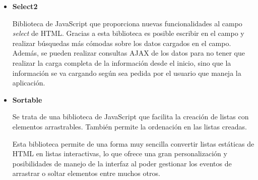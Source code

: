 \begin{itemize}
\item\textbf{Select2}

Biblioteca de JavaScript que proporciona nuevas funcionalidades al campo \textit{select} de HTML. 
Gracias a esta biblioteca es posible escribir en el campo y realizar búsquedas más cómodas sobre los datos cargados en el campo.
Además, se pueden realizar consultas AJAX de los datos para no tener que realizar la carga completa de la información desde el inicio, sino que la información se va cargando según sea pedida por el usuario que maneja la aplicación.

\item\textbf{Sortable}

Se trata de una biblioteca de JavaScript que facilita la creación de listas con elementos arrastrables. También permite la ordenación en las listas creadas.

Esta biblioteca permite de una forma muy sencilla convertir listas estáticas de HTML en listas interactivas, lo que ofrece una gran personalización y posibilidades de manejo de la interfaz al poder gestionar los eventos de arrastrar o soltar elementos entre muchos otros. 
\end{itemize}

